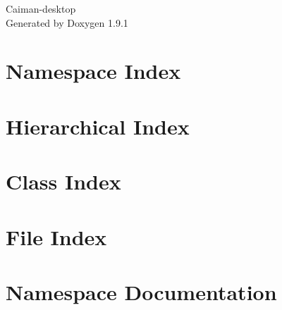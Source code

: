 \let\mypdfximage\pdfximage\def\pdfximage{\immediate\mypdfximage}\documentclass[twoside]{book}
\newcommand{\+}{\discretionary{\mbox{\scriptsize$\hookleftarrow$}}{}{}}
\newcommand{\clearemptydoublepage}{%
  \newpage{\pagestyle{empty}\cleardoublepage}%
}
\begin{document}
\raggedbottom

\hypersetup{pageanchor=false,
             bookmarksnumbered=true,
             pdfencoding=unicode
            }
\begin{titlepage}
\vspace*{7cm}
\begin{center}%
{\Large Caiman-\/desktop }\\
\vspace*{1cm}
{\large Generated by Doxygen 1.9.1}\\
\end{center}
\end{titlepage}
\clearemptydoublepage
{}
\tableofcontents
\clearemptydoublepage
{}
\hypersetup{pageanchor=true}

\chapter{Namespace Index}

\chapter{Hierarchical Index}

\chapter{Class Index}

\chapter{File Index}

\chapter{Namespace Documentation}








\end{document}
